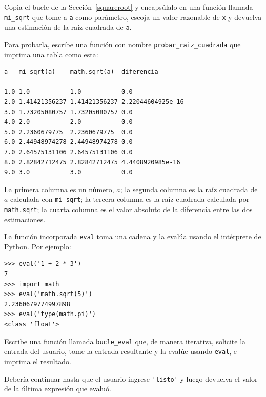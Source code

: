 \documentclass[10pt]{book}
\begin{document}
\begin{exercise}

Copia el bucle de la Sección~\ref{squareroot}
y encapsúlalo en una función llamada
\verb"mi_sqrt" que tome a {\tt a} como parámetro, escoja un
valor razonable de {\tt x} y devuelva una estimación de la raíz
cuadrada de {\tt a}.  

Para probarla, escribe una función con nombre \verb"probar_raiz_cuadrada"
que imprima una tabla como esta:

\begin{verbatim}
a   mi_sqrt(a)    math.sqrt(a)  diferencia
-   ----------    ------------  ----------
1.0 1.0           1.0           0.0
2.0 1.41421356237 1.41421356237 2.22044604925e-16
3.0 1.73205080757 1.73205080757 0.0
4.0 2.0           2.0           0.0
5.0 2.2360679775  2.2360679775  0.0
6.0 2.44948974278 2.44948974278 0.0
7.0 2.64575131106 2.64575131106 0.0
8.0 2.82842712475 2.82842712475 4.4408920985e-16
9.0 3.0           3.0           0.0
\end{verbatim}
%
La primera columna es un número, $a$; la segunda columna es la raíz
cuadrada de $a$ calculada con \verb"mi_sqrt"; la tercera columna es la
raíz cuadrada calculada por {\tt math.sqrt}; la cuarta columna es el
valor absoluto de la diferencia entre las dos estimaciones.
\end{exercise}


\begin{exercise}

La función incorporada {\tt eval} toma una cadena y la evalúa
usando el intérprete de Python.  Por ejemplo:

\begin{verbatim}
>>> eval('1 + 2 * 3')
7
>>> import math
>>> eval('math.sqrt(5)')
2.2360679774997898
>>> eval('type(math.pi)')
<class 'float'>
\end{verbatim}
%
Escribe una función llamada \verb"bucle_eval" que, de manera iterativa,
solicite la entrada del usuario, tome la entrada resultante y la evalúe
usando {\tt eval}, e imprima el resultado.

Debería continuar hasta que el usuario ingrese \verb"'listo'" y luego
devuelva el valor de la última expresión que evaluó.

\end{exercise}
\end{document}
